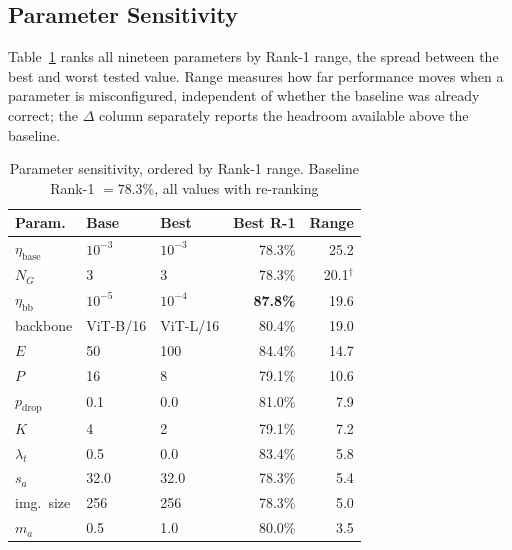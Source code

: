 \documentclass[conference]{IEEEtran}
\begin{document}
\subsection{Parameter Sensitivity}

Table~\ref{tab:sensitivity} ranks all nineteen parameters by Rank-1 range, the spread
between the best and worst tested value. Range measures how far performance moves when
a parameter is misconfigured, independent of whether the baseline was already correct;
the $\Delta$ column separately reports the headroom available above the baseline.

\begin{table}[t]
  \caption{Parameter sensitivity, ordered by Rank-1 range. Baseline Rank-1 $=78.3\%$,
    all values with re-ranking}
  \label{tab:sensitivity}
  \centering
  \scriptsize
  \begin{tabular}{@{}lllrr@{}}
    \toprule
    \textbf{Param.}      & \textbf{Base} & \textbf{Best} & \textbf{Best R-1} & \textbf{Range} \\
    \midrule
    $\eta_{\text{base}}$ & $10^{-3}$     & $10^{-3}$     & 78.3\%            & 25.2           \\
    $N_G$                & 3             & 3             & 78.3\%            & 20.1$^\dagger$ \\
    $\eta_{\text{bb}}$   & $10^{-5}$     & $10^{-4}$     & \textbf{87.8\%}   & 19.6           \\
    backbone             & ViT-B/16      & ViT-L/16      & 80.4\%            & 19.0           \\
    $E$                  & 50            & 100           & 84.4\%            & 14.7           \\
    $P$                  & 16            & 8             & 79.1\%            & 10.6           \\
    $p_{\text{drop}}$    & 0.1           & 0.0           & 81.0\%            & 7.9            \\
    $K$                  & 4             & 2             & 79.1\%            & 7.2            \\
    $\lambda_t$          & 0.5           & 0.0           & 83.4\%            & 5.8            \\
    $s_a$                & 32.0          & 32.0          & 78.3\%            & 5.4            \\
    img.\ size           & 256           & 256           & 78.3\%            & 5.0            \\
    $m_a$                & 0.5           & 1.0           & 80.0\%            & 3.5            \\

\end{tabular}
\end{table}
\end{document}
